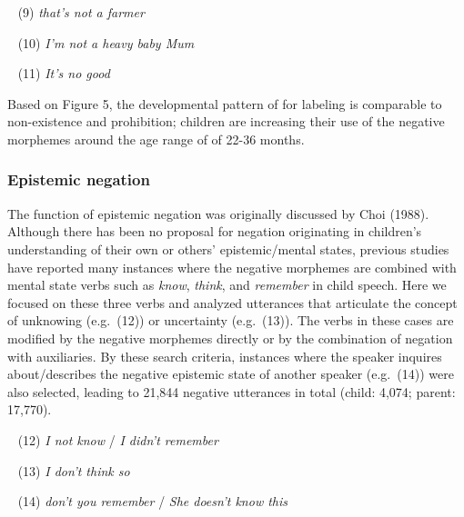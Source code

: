 \documentclass[10pt, letterpaper]{article}
\begin{document}
~ (9) \emph{that's not a farmer}

~ (10) \emph{I'm not a heavy baby Mum}

~ (11) \emph{It's no good}

Based on Figure 5, the developmental pattern of for labeling is
comparable to non-existence and prohibition; children are increasing
their use of the negative morphemes around the age range of of 22-36
months.

\hypertarget{epistemic-negation}{%
\subsubsection{Epistemic negation}\label{epistemic-negation}}

The function of epistemic negation was originally discussed by Choi
(1988). Although there has been no proposal for negation originating in
children's understanding of their own or others' epistemic/mental
states, previous studies have reported many instances where the negative
morphemes are combined with mental state verbs such as \emph{know},
\emph{think}, and \emph{remember} in child speech. Here we focused on
these three verbs and analyzed utterances that articulate the concept of
unknowing (e.g.~(12)) or uncertainty (e.g.~(13)). The verbs in these
cases are modified by the negative morphemes directly or by the
combination of negation with auxiliaries. By these search criteria,
instances where the speaker inquires about/describes the negative
epistemic state of another speaker (e.g.~(14)) were also selected,
leading to 21,844 negative utterances in total (child: 4,074; parent:
17,770).

~ (12) \emph{I not know} / \emph{I didn't remember}

~ (13) \emph{I don't think so}

~ (14) \emph{don't you remember} / \emph{She doesn't know this}
\end{document}

